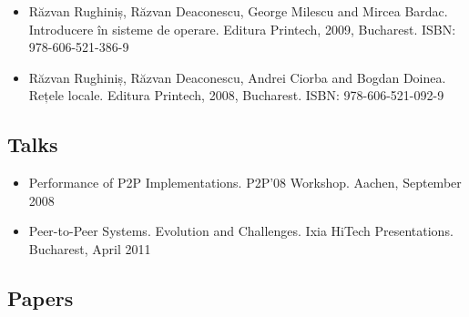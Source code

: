 \begin{itemize}
  \item Răzvan Rughiniș, Răzvan Deaconescu, George Milescu and Mircea Bardac.
  Introducere în sisteme de operare. Editura Printech, 2009, Bucharest. ISBN:
  978-606-521-386-9
  \item Răzvan Rughiniș, Răzvan Deaconescu, Andrei Ciorba and Bogdan Doinea.
  Rețele locale. Editura Printech, 2008, Bucharest. ISBN: 978-606-521-092-9
\end{itemize}

\subsection{Talks}

\begin{itemize}
  \item Performance of P2P Implementations. P2P'08 Workshop. Aachen, September
  2008
  \item Peer-to-Peer Systems. Evolution and Challenges. Ixia HiTech
  Presentations. Bucharest, April 2011
\end{itemize}

\subsection{Papers}


